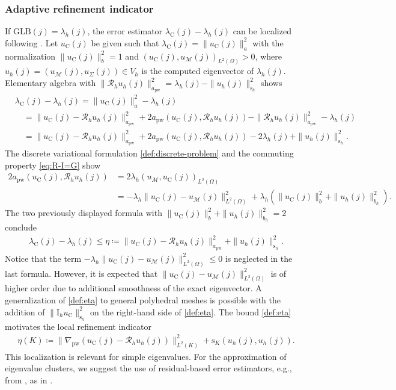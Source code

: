 \documentclass[a4paper]{amsart}
\numberwithin{equation}{section}
\newcommand{\I}{\mathrm{I}}
\newcommand{\Mcal}{\mathcal{M}}
\newcommand{\s}{\mathrm{s}}
\newcommand{\pw}{\mathrm{pw}}
\theoremstyle{remark}
\theoremstyle{definition}
\theoremstyle{assumptionnoperiod}
\begin{document}
\subsubsection{Adaptive refinement indicator}
If $\mathrm{GLB}(j) = \lambda_h(j)$, the error estimator $\lambda_\mathrm{C}(j) - \lambda_h(j)$ can be localized following \cite[Lemma 6.3]{StrangFix1973}. Let $u_\mathrm{C}(j)$ be given such that $\lambda_\mathrm{C}(j) = \|u_\mathrm{C}(j)\|_a^2$ with the normalization $\|u_\mathrm{C}(j)\|_b^2 = 1$ and $(u_\mathrm{C}(j), u_\Mcal(j))_{L^2(\Omega)} > 0$, where $u_h(j) = (u_\Mcal(j),u_\Sigma(j)) \in V_h$ is the computed eigenvector of $\lambda_h(j)$.
Elementary algebra with $\|\mathcal{R}_h u_h(j)\|^2_{a_\pw} = \lambda_h(j) - \|u_h(j)\|_{\s_h}^2$ shows
\begin{align*}
	&\lambda_\mathrm{C}(j) - \lambda_h(j) = \|u_\mathrm{C}(j)\|_a^2 - \lambda_h(j)\\
	&\quad= \|u_\mathrm{C}(j) - \mathcal{R}_h u_h(j)\|^2_{a_\pw} + 2a_\pw(u_\mathrm{C}(j), \mathcal{R}_h u_h(j)) - \|\mathcal{R}_h u_h(j)\|^2_{a_\pw} - \lambda_h(j)\\
	&\quad= \|u_\mathrm{C}(j) - \mathcal{R}_h u_h(j)\|^2_{a_\pw} + 2a_\pw(u_\mathrm{C}(j), \mathcal{R}_h u_h(j)) - 2 \lambda_h(j) + \|u_h(j)\|_{\s_h}^2.
\end{align*}
The discrete variational formulation \eqref{def:discrete-problem} and the commuting property \eqref{eq:R-I=G} show
\begin{align*}
	2a_\pw(u_\mathrm{C}(j), \mathcal{R}_h u_h(j)) &= 2\lambda_h(u_\Mcal, u_\mathrm{C}(j))_{L^2(\Omega)}\\
	& = -\lambda_h\|u_\mathrm{C}(j) - u_\Mcal(j)\|^2_{L^2(\Omega)} + \lambda_h(\|u_\mathrm{C}(j)\|^2_b + \|u_h(j)\|_{b_h}^2).
\end{align*}
The two previously displayed formula with $\|u_\mathrm{C}(j)\|^2_b + \|u_h(j)\|_{b_h}^2 = 2$ conclude
\begin{align}\label{def:eta}
	\lambda_\mathrm{C}(j) - \lambda_h(j) \leq \eta \coloneqq \|u_\mathrm{C}(j) - \mathcal{R}_h u_h(j)\|^2_{a_\pw} + \|u_h(j)\|^2_{\s_h}.
\end{align}
Notice that the term $-\lambda_h\|u_\mathrm{C}(j) - u_\Mcal(j)\|^2_{L^2(\Omega)} \leq 0$ is neglected in the last formula. However, it is expected that $\|u_\mathrm{C}(j) - u_\Mcal(j)\|^2_{L^2(\Omega)}$ is of higher order due to additional smoothness of the exact eigenvector.
A generalization of \eqref{def:eta} to general polyhedral meshes is possible with the addition of $\|\I_h u_\mathrm{C}\|_{\s_h}^2$ on the right-hand side of \eqref{def:eta}.
The bound \eqref{def:eta}
motivates the local refinement indicator
\begin{align*}
	\eta(K) \coloneqq \|\nabla_\pw (u_\mathrm{C}(j) - \mathcal{R}_h u_h(j))\|^2_{L^2(K)} + \s_K(u_h(j), u_h(j)).
\end{align*}
This localization is relevant for simple eigenvalues. For the approximation of eigenvalue clusters, we suggest the use of residual-based error estimators, e.g., from \cite{CarstensenGraessleTran2024}, as in \cite{Gallistl2014}.
\end{document}

